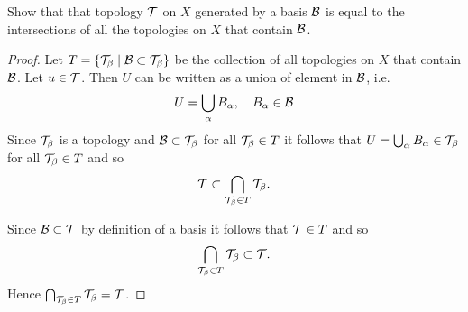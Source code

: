 \begin{ex}{13.5}
    Show that that topology $\mathcal{T}$ on $X$ generated by a basis $\mathcal{B}$ is equal to the intersections of all the topologies on $X$ that contain $\mathcal{B}$.
\end{ex}
\begin{proof}
    Let $T = \left\{\mathcal{T}_{\beta}\mid \mathcal{B}\subset\mathcal{T}_{\beta}\right\}$ be the collection of all topologies on $X$ that contain $\mathcal{B}$. Let $u\in\mathcal{T}$. Then $U$ can be written as a union of element in $\mathcal{B}$, i.e.
    $$
        U = \bigcup_{\alpha} B_\alpha,\quad B_\alpha\in\mathcal{B}
    $$
    Since $\mathcal{T}_\beta$ is a topology and $\mathcal{B}\subset\mathcal{T}_\beta$ for all $\mathcal{T}_\beta\in T$ it follows that $U= \bigcup_{\alpha} B_\alpha\in\mathcal{T}_\beta$ for all $\mathcal{T}_\beta\in T$ and so 
    $$\mathcal{T}\subset\bigcap_{\mathcal{T}_\beta\in T}\mathcal{T}_\beta.$$

    Since $\mathcal{B}\subset\mathcal{T}$ by definition of a basis it follows that $\mathcal{T}\in T$ and so 
    $$
    \bigcap_{\mathcal{T}_\beta\in T}\mathcal{T}_\beta\subset\mathcal{T}.
    $$
    Hence $\bigcap_{\mathcal{T}_\beta\in T}\mathcal{T}_\beta=\mathcal{T}$.
\end{proof}

\begin{ex}{13.7}
\end{ex}
\begin{sol}
    
\end{sol}

